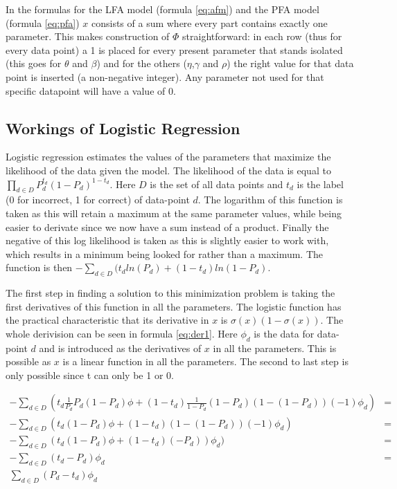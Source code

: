 \documentclass{scrartcl}
\begin{document}
In the formulas for the LFA model (formula \ref{eq:afm}) and the PFA model (formula \ref{eq:pfa}) $x$ consists of a sum where every part contains exactly one parameter. This makes construction of $\Phi$ straightforward: in each row (thus for every data point) a 1 is placed for every present parameter that stands isolated (this goes for $\theta$ and $\beta$) and for the others ($\eta$,$\gamma$ and $\rho$) the right value for that data point is inserted (a non-negative integer). Any parameter not used for that specific datapoint will have a value of 0.

\subsection{Workings of Logistic Regression}
Logistic regression estimates the values of the parameters that maximize the likelihood of the data given the model. The likelihood of the data is equal to $\prod_{d \in D} P_{d}^{t_d}  (1- P_{d})^{1-t_d} $. Here $D$ is the set of all data points and $t_{d}$ is the label (0 for incorrect, 1 for correct) of data-point $d$. The logarithm of this function is taken as this will retain a maximum at the same parameter values, while being easier to derivate since we now have a sum instead of a product. Finally the negative of this log likelihood is taken as this is slightly easier to work with, which results in a minimum being looked for rather than a maximum. The function is then $-\sum_{d \in D}(t_{d} ln(P_{d})+(1-t_{d}) ln(1-P_{d})$.

The first step in finding a solution to this minimization problem is taking the first derivatives of this function in all the parameters. The logistic function has the practical characteristic that its derivative in $x$ is $\sigma (x) (1- \sigma(x))$. The whole derivision can be seen in formula \ref{eq:der1}. Here $\phi_{d}$ is the data for data-point $d$ and is introduced as the derivatives of $x$ in all the parameters. This is possible as $x$ is a linear function in all the parameters. The second to last step is only possible since t can only be 1 or 0. 

\begin{equation}
\label{eq:der1}
\begin{split}
-\sum_{d \in D}(t_{d} \frac{1}{P_{d}} P_{d} (1-P_{d})\phi + (1-t_{d}) \frac{1}{1-P_{d}}(1-P_{d}) (1-(1-P_{d}))(-1)\phi_{d}) &=  \\
-\sum_{d \in D}(t_{d} (1-P_{d})\phi + (1-t_{d})(1-(1-P_{d}))(-1)\phi_{d}) &= \\
-\sum_{d \in D}(t_{d} (1-P_{d})\phi + (1-t_{d})(-P_{d}))\phi_{d}) & = \\
-\sum_{d \in D}(t_{d}-P_{d})\phi_{d} &= \\
\sum_{d \in D}(P_{d}-t_{d})\phi_{d} &
\end{split}
\end{equation}
\end{document}
